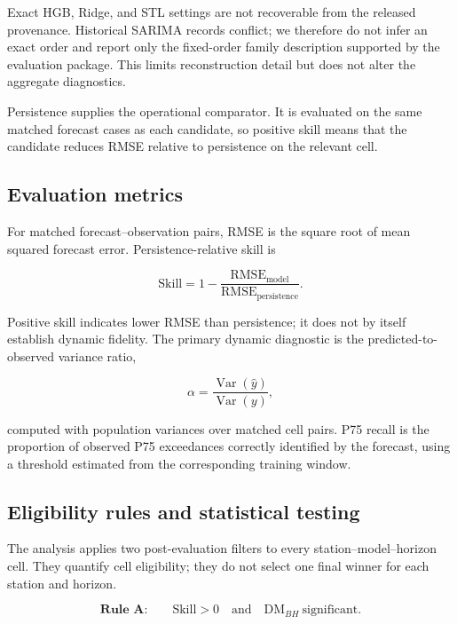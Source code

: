 Exact HGB, Ridge, and STL settings are not recoverable from the released
provenance. Historical SARIMA records conflict; we therefore do not infer
an exact order and report only the fixed-order family description supported
by the evaluation package. This limits reconstruction detail but does not
alter the aggregate diagnostics.

Persistence supplies the operational comparator. It is evaluated on the
same matched forecast cases as each candidate, so positive skill means that
the candidate reduces RMSE relative to persistence on the relevant cell.

\subsection{Evaluation metrics}

For matched forecast--observation pairs, RMSE is the square root of mean
squared forecast error. Persistence-relative skill is

\begin{equation}
\mathrm{Skill}=1-\frac{\mathrm{RMSE}_{\mathrm{model}}}
{\mathrm{RMSE}_{\mathrm{persistence}}}.
\label{eq:skill}
\end{equation}

Positive skill indicates lower RMSE than persistence; it does not by
itself establish dynamic fidelity. The primary dynamic diagnostic is the
predicted-to-observed variance ratio,

\begin{equation}
\alpha=\frac{\operatorname{Var}(\hat y)}{\operatorname{Var}(y)},
\label{eq:alpha}
\end{equation}

computed with population variances over matched cell pairs. P75 recall is
the proportion of observed P75 exceedances correctly identified by the
forecast, using a threshold estimated from the corresponding training
window.

\subsection{Eligibility rules and statistical testing}

The analysis applies two post-evaluation filters to every
station--model--horizon cell. They quantify cell eligibility; they do not
select one final winner for each station and horizon.

\begin{equation}
\textbf{Rule A:}\qquad \mathrm{Skill}>0\quad\text{and}\quad
\mathrm{DM}_{BH}\ \text{significant}.
\label{eq:rule-a}
\end{equation}

